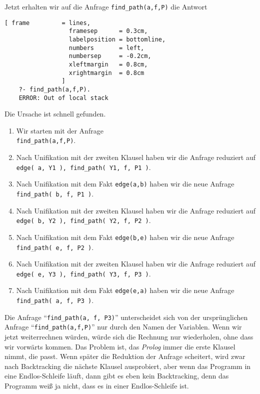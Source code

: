 Jetzt erhalten wir auf die Anfrage \texttt{find\_path(a,f,P)} die Antwort
\begin{Verbatim}[ frame         = lines, 
                  framesep      = 0.3cm, 
                  labelposition = bottomline,
                  numbers       = left,
                  numbersep     = -0.2cm,
                  xleftmargin   = 0.8cm,
                  xrightmargin  = 0.8cm
                ]
    ?- find_path(a,f,P).
    ERROR: Out of local stack
\end{Verbatim}
Die Ursache ist schnell gefunden.
\begin{enumerate}
\item Wir starten mit der Anfrage \\[0.1cm]
      \hspace*{1.3cm} \texttt{find\_path(a,f,P)}.
\item Nach Unifikation mit der zweiten Klausel haben wir die Anfrage reduziert auf \\[0.1cm]
      \hspace*{1.3cm} 
      \texttt{edge( a, Y1 ), find\_path( Y1, f, P1 )}.
\item Nach Unifikation mit dem Fakt \texttt{edge(a,b)} haben wir die neue Anfrage \\[0.1cm]
      \hspace*{1.3cm} 
      \texttt{find\_path( b, f, P1 )}.
\item Nach Unifikation mit der zweiten Klausel haben wir die Anfrage reduziert auf \\[0.1cm]
      \hspace*{1.3cm} 
      \texttt{edge( b, Y2 ), find\_path( Y2, f, P2 )}.
\item Nach Unifikation mit dem Fakt \texttt{edge(b,e)} haben wir die neue Anfrage \\[0.1cm]
      \hspace*{1.3cm} 
      \texttt{find\_path( e, f, P2 )}.
\item Nach Unifikation mit der zweiten Klausel haben wir die Anfrage reduziert auf \\[0.1cm]
      \hspace*{1.3cm} 
      \texttt{edge( e, Y3 ), find\_path( Y3, f, P3 )}.
\item Nach Unifikation mit dem Fakt \texttt{edge(e,a)} haben wir die neue Anfrage \\[0.1cm]
      \hspace*{1.3cm} 
      \texttt{find\_path( a, f, P3 )}.
\end{enumerate}
Die Anfrage ``\texttt{find\_path(a, f, P3)}'' unterscheidet sich von der ursprünglichen
Anfrage ``\texttt{find\_path(a,f,P)}'' nur durch den Namen der Variablen.  Wenn wir jetzt
weiterrechnen würden, würde sich die Rechnung nur wiederholen, ohne dass wir vorwärts kommen.
Das Problem ist, das \textsl{Prolog} immer die erste
Klausel nimmt, die passt.  Wenn später die Reduktion der Anfrage scheitert, wird zwar nach
Backtracking die nächste Klausel ausprobiert, aber wenn das Programm in eine
Endlos-Schleife läuft, dann gibt es eben kein Backtracking, denn das Programm weiß ja
nicht, dass es in einer Endlos-Schleife ist.

